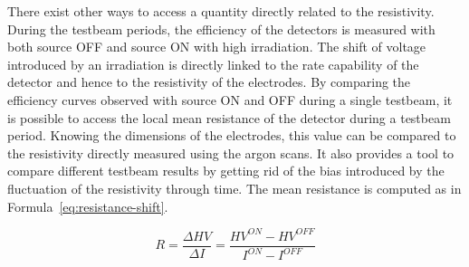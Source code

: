 	There exist other ways to access a quantity directly related to the resistivity. During the testbeam periods, the efficiency of the detectors is measured with both source OFF and source ON with high irradiation. The shift of voltage introduced by an irradiation is directly linked to the rate capability of the detector and hence to the resistivity of the electrodes. By comparing the efficiency curves observed with source ON and OFF during a single testbeam, it is possible to access the local mean resistance of the detector during a testbeam period. Knowing the dimensions of the electrodes, this value can be compared to the resistivity directly measured using the argon scans. It also provides a tool to compare different testbeam results by getting rid of the bias introduced by the fluctuation of the resistivity through time. The mean resistance is computed as in Formula~\ref{eq:resistance-shift}.
	
	\begin{equation}
	\label{eq:resistance-shift}
	R = \frac{\Delta HV}{\Delta I} = \frac{HV^{ON} - HV^{OFF}}{I^{ON} - I^{OFF}}
	\end{equation}
	
